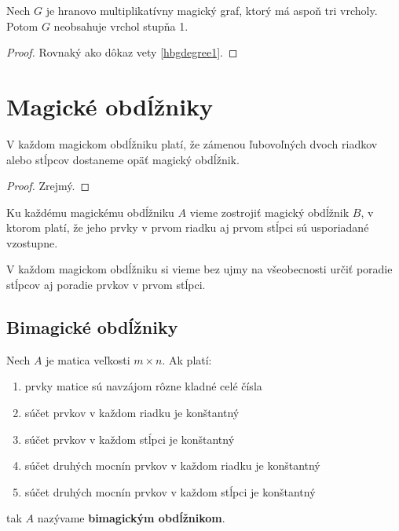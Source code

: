 \begin{theorem} Nech $G$ je hranovo multiplikatívny magický graf, ktorý má aspoň tri vrcholy. Potom $G$ neobsahuje vrchol stupňa 1.
\end{theorem}

\begin{proof} Rovnaký ako dôkaz vety \ref{hbgdegree1}.
\end{proof} 

\section{Magické obdĺžniky}

\begin{theorem} V každom magickom obdĺžniku platí, že zámenou ľubovoľných dvoch riadkov alebo stĺpcov dostaneme opäť magický obdĺžnik.
\end{theorem}

\begin{proof}
Zrejmý.
\end{proof}

\begin{consequence} Ku každému magickému obdĺžniku $A$ vieme zostrojiť magický obdĺžnik $B$, v ktorom platí, že jeho prvky v prvom riadku aj prvom stĺpci sú usporiadané vzostupne.
\end{consequence}

\begin{consequence}
\label{rectangleorder}
V každom magickom obdĺžniku si vieme bez ujmy na všeobecnosti určiť poradie stĺpcov aj poradie prvkov v prvom stĺpci.
\end{consequence}

\subsection{Bimagické obdĺžniky}

\begin{definition} Nech $A$ je matica veľkosti $m \times n$. Ak platí:

\begin{enumerate}
\item prvky matice sú navzájom rôzne kladné celé čísla
\item súčet prvkov v každom riadku je konštantný
\item súčet prvkov v každom stĺpci je konštantný
\item súčet druhých mocnín prvkov v každom riadku je konštantný
\item súčet druhých mocnín prvkov v každom stĺpci je konštantný
\end{enumerate}

tak $A$ nazývame \textbf{bimagickým obdĺžnikom}.
\end{definition} 

